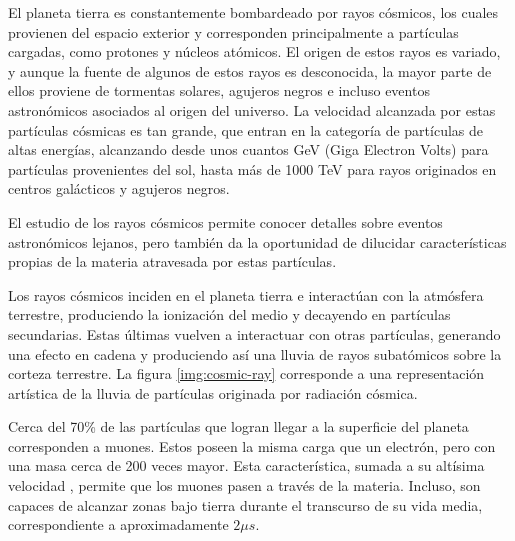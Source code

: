 	El planeta tierra es constantemente bombardeado por rayos cósmicos, los cuales provienen del espacio exterior y corresponden principalmente a partículas cargadas, como protones y núcleos atómicos.  El origen de estos rayos es variado, y aunque la fuente de algunos de estos rayos es desconocida, la mayor parte de ellos proviene de tormentas solares, agujeros negros e incluso eventos astronómicos asociados al origen del universo. La velocidad alcanzada por estas partículas cósmicas es tan grande, que entran en la categoría de partículas de altas energías, alcanzando desde unos cuantos GeV (Giga Electron Volts) para partículas provenientes del sol, hasta más de 1000 TeV para rayos originados en centros galácticos y agujeros negros. 
	
	El estudio de los rayos cósmicos permite conocer detalles sobre eventos astronómicos lejanos, pero también da la oportunidad de dilucidar características propias de la materia atravesada por estas partículas.
	
	Los rayos cósmicos inciden en el planeta tierra e interactúan con la atmósfera terrestre, produciendo la ionización del medio y decayendo en partículas secundarias. Estas últimas vuelven a interactuar con otras partículas, generando una efecto en cadena y produciendo así una lluvia de rayos subatómicos sobre la corteza terrestre. La figura \ref{img:cosmic-ray} corresponde a una representación artística de la lluvia de partículas originada por radiación cósmica.
	
	Cerca del 70\% de las partículas que logran llegar a la superficie del planeta corresponden a muones. Estos poseen la misma carga que un electrón, pero con una masa cerca de 200 veces mayor. Esta característica, sumada a su altísima velocidad , permite que los muones pasen a través de la materia. Incluso, son capaces de alcanzar zonas bajo tierra durante el transcurso de su vida media, correspondiente a aproximadamente $2\mu s$.
	

